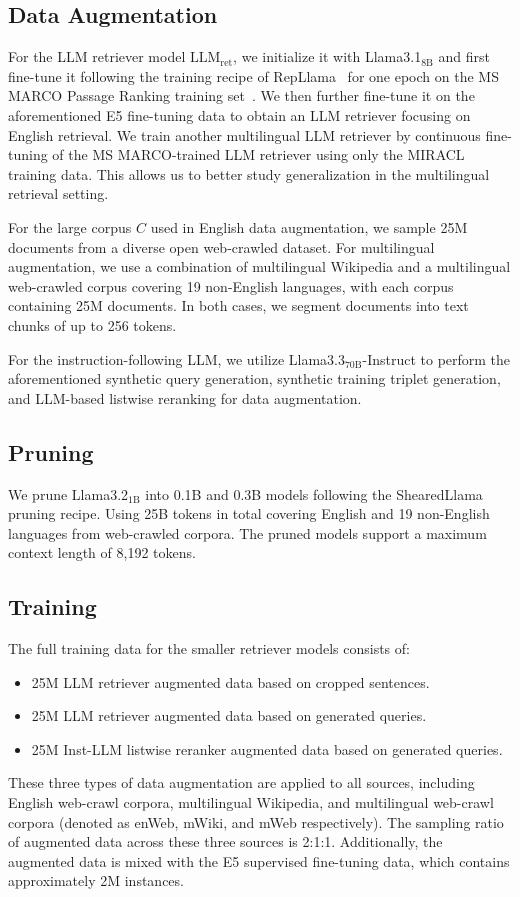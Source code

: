 \documentclass[]{fairmeta}
\begin{document}
\subsection{Data Augmentation}
For the LLM retriever model $\text{LLM}_{\text{ret}}$, we initialize it with Llama3.1$_{\text{8B}}$ and first fine-tune it following the training recipe of RepLlama~\citep{ma2024repllama} for one epoch on the MS MARCO Passage Ranking training set~\citep{bajaj2018msmarcohumangenerated}.
We then further fine-tune it on the aforementioned E5 fine-tuning data to obtain an LLM retriever focusing on English retrieval.
We train another multilingual LLM retriever by continuous fine-tuning of the MS MARCO-trained LLM retriever using only the MIRACL~\citep{miracl} training data.
This allows us to better study generalization in the multilingual retrieval setting.

For the large corpus $C$ used in English data augmentation, we sample 25M documents from a diverse open web-crawled dataset.
For multilingual augmentation, we use a combination of multilingual Wikipedia and a multilingual web-crawled corpus covering 19 non-English languages, with each corpus containing 25M documents.
In both cases, we segment documents into text chunks of up to 256 tokens.

For the instruction-following LLM, we utilize Llama3.3$_\text{70B}$-Instruct to perform the aforementioned synthetic query generation, synthetic training triplet generation, and LLM-based listwise reranking for data augmentation.

\subsection{Pruning}
We prune Llama3.2$_\text{1B}$ into 0.1B and 0.3B models following the ShearedLlama pruning recipe.
Using 25B tokens in total covering English and 19 non-English languages from web-crawled corpora.
The pruned models support a maximum context length of 8,192 tokens.


\subsection{Training}
The full training data for the smaller retriever models consists of:
\begin{itemize}
    \item 25M LLM retriever augmented data based on cropped sentences.
    \item 25M LLM retriever augmented data based on generated queries.
    \item 25M Inst-LLM listwise reranker augmented data based on generated queries.
\end{itemize}
These three types of data augmentation are applied to all sources, including English web-crawl corpora, multilingual Wikipedia, and multilingual web-crawl corpora (denoted as enWeb, mWiki, and mWeb respectively).
The sampling ratio of augmented data across these three sources is 2:1:1.
Additionally, the augmented data is mixed with the E5 supervised fine-tuning data, which contains approximately 2M instances.
\end{document}
